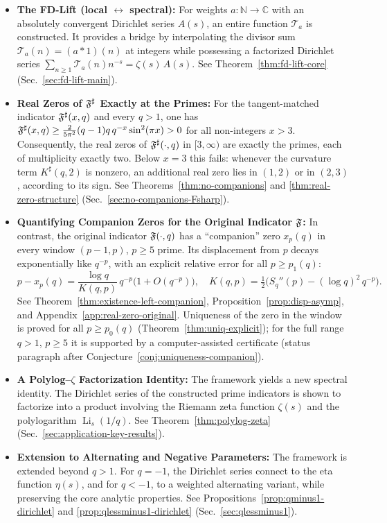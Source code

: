 \begin{itemize}
    \item \textbf{The FD-Lift (local $\leftrightarrow$ spectral):} For weights $a:\mathbb N\to\mathbb C$ with an absolutely convergent Dirichlet series $A(s)$, an entire function $\mathcal T_a$ is constructed. It provides a bridge by interpolating the divisor sum $\mathcal T_a(n)=(a*1)(n)$ at integers while possessing a factorized Dirichlet series $\sum_{n\ge1}\mathcal T_a(n)n^{-s}=\zeta(s)\,A(s)$. See Theorem~\ref{thm:fd-lift-core} (Sec.~\ref{sec:fd-lift-main}).

    \item \textbf{Real Zeros of $\mathfrak F^{\sharp}$ Exactly at the Primes:} For the tangent-matched indicator $\mathfrak F^{\sharp}(x,q)$ and every $q>1$, one has $\mathfrak F^{\sharp}(x,q)\ge\frac{2}{5\pi^2}(q-1)q\,q^{-x}\sin^2(\pi x)>0$ for all non-integers $x>3$. Consequently, the real zeros of $\mathfrak F^{\sharp}(\cdot,q)$ in $[3,\infty)$ are exactly the primes, each of multiplicity exactly two. Below $x=3$ this fails: whenever the curvature term $K^\sharp(q,2)$ is nonzero, an additional real zero lies in $(1,2)$ or in $(2,3)$, according to its sign. See Theorems~\ref{thm:no-companions} and \ref{thm:real-zero-structure} (Sec.~\ref{sec:no-companions-Fsharp}).

    \item \textbf{Quantifying Companion Zeros for the Original Indicator $\mathfrak F$:} In contrast, the original indicator $\mathfrak F(\cdot,q)$ has a ``companion'' zero $x_p(q)$ in every window $(p-1,p)$, $p\ge5$ prime. Its displacement from $p$ decays exponentially like $q^{-p}$, with an explicit relative error for all $p\ge p_1(q)$:
    \[
    p-x_p(q)=\frac{\log q}{K(q,p)}\,q^{-p}\bigl(1+O(q^{-p})\bigr),
    \quad
    K(q,p)=\tfrac12\Big(S_q''(p)-(\log q)^2\,q^{-p}\Big).
    \]
    See Theorem~\ref{thm:existence-left-companion}, Proposition~\ref{prop:disp-asymp}, and Appendix~\ref{app:real-zero-original}. Uniqueness of the zero in the window is proved for all $p\ge p_0(q)$ (Theorem~\ref{thm:uniq-explicit}); for the full range $q>1$, $p\ge5$ it is supported by a computer-assisted certificate (status paragraph after Conjecture~\ref{conj:uniqueness-companion}).

    \item \textbf{A Polylog–$\zeta$ Factorization Identity:} The framework yields a new spectral identity. The Dirichlet series of the constructed prime indicators is shown to factorize into a product involving the Riemann zeta function $\zeta(s)$ and the polylogarithm $\operatorname{Li}_s(1/q)$.
    See Theorem~\ref{thm:polylog-zeta} (Sec.~\ref{sec:application-key-results}).

    \item \textbf{Extension to Alternating and Negative Parameters:} The framework is extended beyond $q>1$. For $q=-1$, the Dirichlet series connect to the eta function $\eta(s)$, and for $q<-1$, to a weighted alternating variant, while preserving the core analytic properties. See Propositions~\ref{prop:qminus1-dirichlet} and \ref{prop:qlessminus1-dirichlet} (Sec.~\ref{sec:qlessminus1}).
\end{itemize}

